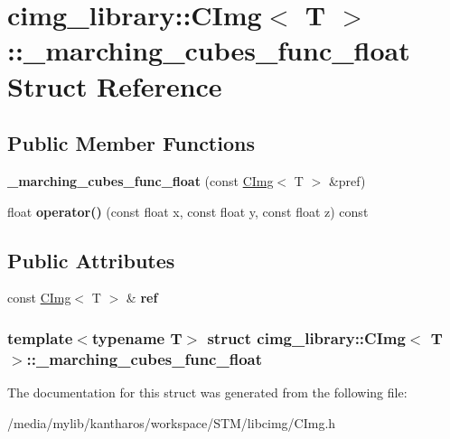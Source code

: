 \hypertarget{structcimg__library_1_1_c_img_1_1__marching__cubes__func__float}{
\section{cimg\_\-library::CImg$<$ T $>$::\_\-marching\_\-cubes\_\-func\_\-float Struct Reference}
\label{structcimg__library_1_1_c_img_1_1__marching__cubes__func__float}
}
\subsection*{Public Member Functions}
\begin{DoxyCompactItemize}
\item 
\hypertarget{structcimg__library_1_1_c_img_1_1__marching__cubes__func__float_ac427be16bcdf8a7ca079446edaf801dd}{
{\bfseries \_\-marching\_\-cubes\_\-func\_\-float} (const \hyperlink{structcimg__library_1_1_c_img}{CImg}$<$ T $>$ \&pref)}
\label{structcimg__library_1_1_c_img_1_1__marching__cubes__func__float_ac427be16bcdf8a7ca079446edaf801dd}

\item 
\hypertarget{structcimg__library_1_1_c_img_1_1__marching__cubes__func__float_afaa800eb8dccc82cce111d6bae63cc16}{
float {\bfseries operator()} (const float x, const float y, const float z) const }
\label{structcimg__library_1_1_c_img_1_1__marching__cubes__func__float_afaa800eb8dccc82cce111d6bae63cc16}

\end{DoxyCompactItemize}
\subsection*{Public Attributes}
\begin{DoxyCompactItemize}
\item 
\hypertarget{structcimg__library_1_1_c_img_1_1__marching__cubes__func__float_a90dce72fbf8ec28b439dce439bb5b0c1}{
const \hyperlink{structcimg__library_1_1_c_img}{CImg}$<$ T $>$ \& {\bfseries ref}}
\label{structcimg__library_1_1_c_img_1_1__marching__cubes__func__float_a90dce72fbf8ec28b439dce439bb5b0c1}

\end{DoxyCompactItemize}
\subsubsection*{template$<$typename T$>$ struct cimg\_\-library::CImg$<$ T $>$::\_\-marching\_\-cubes\_\-func\_\-float}



The documentation for this struct was generated from the following file:\begin{DoxyCompactItemize}
\item 
/media/mylib/kantharos/workspace/STM/libcimg/CImg.h\end{DoxyCompactItemize}
